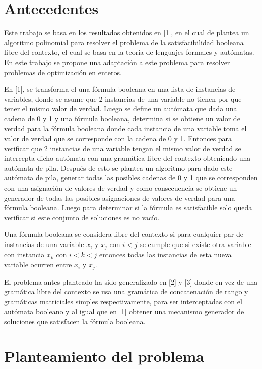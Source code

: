 \documentclass{article}
\begin{document}
\section*{Antecedentes}

Este trabajo se basa en los resultados obtenidos en [1], en el cual de plantea un algoritmo polinomial para resolver el problema de la satisfacibilidad booleana libre del contexto, el cual
se basa en la teoría de lenguajes formales y autómatas. En este trabajo se propone una adaptación a este problema para resolver problemas de optimización en enteros.

En [1], se transforma el una fórmula booleana en una lista de instancias de variables, donde se asume que 2 instancias de una variable no tienen por que
tener el mismo valor de verdad. Luego se define un autómata que dada una cadena de 0 y 1 y una fórmula booleana, determina si se obtiene un valor de verdad para 
la fórmula booleana donde cada instancia de una variable toma el valor de verdad que se corresponde con la cadena de 0 y 1. Entonces para verificar 
que 2 instancias de una variable tengan el mismo valor de verdad se intercepta dicho autómata con una gramática libre del contexto obteniendo una autómata de pila.
Después de esto se plantea un algoritmo para dado este autómata de pila, generar todas las posibles cadenas de 0 y 1 que se corresponden con una asignación de valores de verdad y 
como consecuencia se obtiene un  generador de todas las posibles asignaciones de valores de verdad para una fórmula booleana. Luego para determinar si la fórmula es satisfacible
solo queda verificar si este conjunto de soluciones es no vacío.

Una fórmula booleana se considera libre del contexto si para cualquier par de instancias de una variable $x_i$ y $x_j$ con $i<j$ se cumple que si existe otra variable con instancia 
$x_k$ con $i<k<j$ entonces todas las instancias de esta nueva variable ocurren entre $x_i$ y $x_j$. 

El problema antes planteado ha sido generalizado en [2] y [3] donde en vez de una gramática libre del contexto se usa una gramática de concatenación de rango y gramáticas matriciales simples
respectivamente, para ser interceptadas con el autómata booleano y al igual que en [1] obtener una mecanismo generador de soluciones que satisfacen la fórmula booleana.

\section*{Planteamiento del problema}
\end{document}
